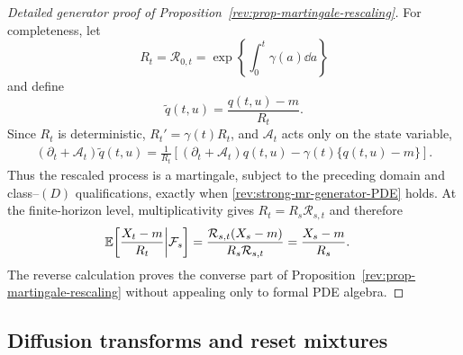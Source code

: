 \begin{proof}[Detailed generator proof of
Proposition~\ref{rev:prop-martingale-rescaling}]
For completeness, let
\[
R_t=\mathcal R_{0,t}=\exp\!\left\{\int_0^t\gamma(a)\dd a\right\}
\]
and define
\[
\widetilde q(t,u)=\frac{q(t,u)-m}{R_t}.
\]
Since $R_t$ is deterministic, $R_t'=\gamma(t)R_t$, and
$\mathcal A_t$ acts only on the state variable,
\begin{align}
(\partial_t+\mathcal A_t)\widetilde q(t,u)
=\frac{1}{R_t}
\left[(\partial_t+\mathcal A_t)q(t,u)
-\gamma(t)\{q(t,u)-m\}\right].
\label{rev:app-rescaled-generator}
\end{align}
Thus the rescaled process is a martingale, subject to the preceding domain and
class--$(D)$ qualifications, exactly when
\eqref{rev:strong-mr-generator-PDE} holds.  At the finite-horizon level,
multiplicativity gives $R_t=R_s\mathcal R_{s,t}$ and therefore
\begin{align*}
\mathbb E\!\left[\frac{X_t-m}{R_t}\middle|\mathcal F_s\right]
&=\frac{\mathcal R_{s,t}(X_s-m)}{R_s\mathcal R_{s,t}}
=\frac{X_s-m}{R_s}.
\end{align*}
The reverse calculation proves the converse part of
Proposition~\ref{rev:prop-martingale-rescaling} without appealing only to formal PDE
algebra.
\end{proof}

\subsection{Diffusion transforms and reset mixtures}
\label{rev:app-transform-reset-proofs}

